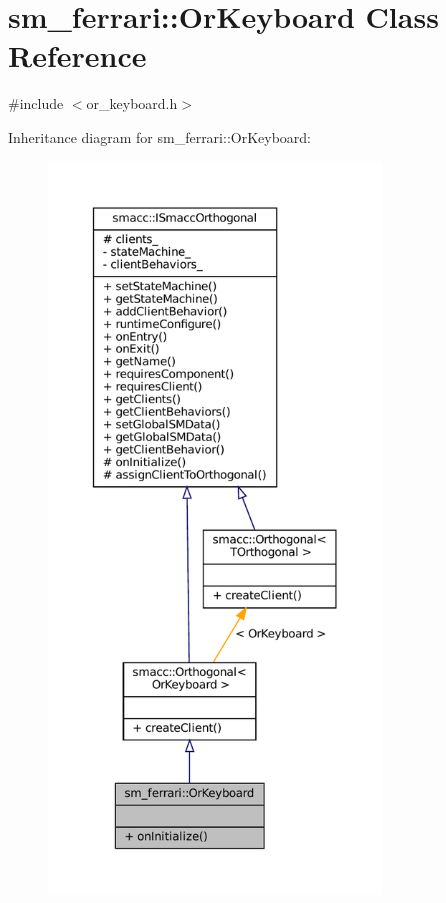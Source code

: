 \hypertarget{classsm__ferrari_1_1OrKeyboard}{}\section{sm\+\_\+ferrari\+:\+:Or\+Keyboard Class Reference}
\label{classsm__ferrari_1_1OrKeyboard}


{\ttfamily \#include $<$or\+\_\+keyboard.\+h$>$}



Inheritance diagram for sm\+\_\+ferrari\+:\+:Or\+Keyboard\+:
\nopagebreak
\begin{figure}[H]
\begin{center}
\leavevmode
\includegraphics[height=550pt]{classsm__ferrari_1_1OrKeyboard__inherit__graph}
\end{center}
\end{figure}



